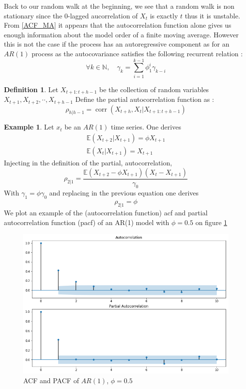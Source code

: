\documentclass{article}
\DeclareMathOperator{\cor}{corr}
\theoremstyle{definition}
\newtheorem{ex}{Example}[section]
\newtheorem{Def}{Definition}[section]
\begin{document}
Back to our random walk at the beginning, we see that a random walk is non stationary since the 0-lagged aucorrelation of $X_t$ is exactly $t$ thus it is unstable.
From \ref{ACF_MA} it appears that the autocorrelation function alone gives us enough information about the model order of a finite moving average. However this is not the case if the process has an autoregressive component as for an $AR(1)$ process as the autocovariance satisfies the following recurrent relation : 
\begin{equation*}
    \forall k\in\mathds{N},\quad\gamma_k=\sum_{i=1}^{k-1}\phi_1^i\gamma_{k-i}
\end{equation*}
\begin{Def}
Let $X_{t+1:t+h-1}$ be the  collection of random variables $X_{t+1},X_{t+2},\cdot\cdot,X_{t+h-1}$  Define the partial autocorrelation function as :
\begin{equation*}
    \rho_{h|h-1}=\cor(X_{t+h},X_t|X_{t+1:t+h-1})
\end{equation*}
\end{Def}
\begin{ex}
Let $x_t$ be an $AR(1)$ time series. One derives \begin{align*}
    \mathbb{E}(X_{t+2}|X_{t+1})=\phi X_{t+1}\\
    \mathbb{E}(X_{t}|X_{t+1})=X_{t+1}
\end{align*}
Injecting in the definition of the partial, autocorrelation, \begin{equation*}
\rho_{2|1}=\frac{\mathbb{E}(X_{t+2}-\phi X_{t+1})(X_{t}-X_{t+1})}{\gamma_0}
\end{equation*}
With $\gamma_1=\phi\gamma_0$ and replacing in the previous equation one derives \begin{equation*}
    \rho_{2|1}=\phi
\end{equation*}
We plot an example of the (autocorrelation function) acf and partial autocorrelation function (pacf) of an AR(1) model with $\phi=0.5$ on figure \ref{fig:acf_pacf_AR1}
\begin{figure}[h]
    \includegraphics[width=\textwidth]{acf_pacf_AR1.png}
    \caption{ACF and PACF of $AR(1)$, $\phi=0.5$}
    \label{fig:acf_pacf_AR1}
\end{figure}
\end{ex}
\end{document}
